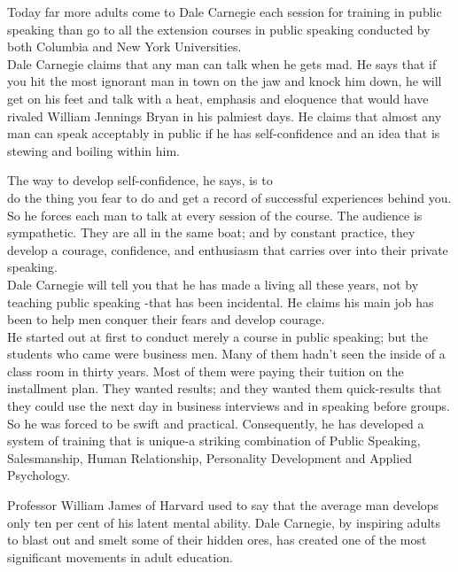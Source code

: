 \documentclass[10pt]{article}
\begin{document}
Today far more adults come to Dale Carnegie each session for training in public speaking than go to all the extension courses in public speaking conducted by both Columbia and New York Universities.\\
Dale Carnegie claims that any man can talk when he gets mad. He says that if you hit the most ignorant man in town on the jaw and knock him down, he will get on his feet and talk with a heat, emphasis and eloquence that would have rivaled William Jennings Bryan in his palmiest days. He claims that almost any man can speak acceptably in public if he has self-confidence and an idea that is stewing and boiling within him.

The way to develop self-confidence, he says, is to\\
do the thing you fear to do and get a record of successful experiences behind you. So he forces each man to talk at every session of the course. The audience is sympathetic. They are all in the same boat; and by constant practice, they develop a courage, confidence, and enthusiasm that carries over into their private speaking.\\
Dale Carnegie will tell you that he has made a living all these years, not by teaching public speaking -that has been incidental. He claims his main job has been to help men conquer their fears and develop courage.\\
He started out at first to conduct merely a course in public speaking; but the students who came were business men. Many of them hadn't seen the inside of a class room in thirty years. Most of them were paying their tuition on the installment plan. They wanted results; and they wanted them quick-results that they could use the next day in business interviews and in speaking before groups.\\
So he was forced to be swift and practical. Consequently, he has developed a system of training that is unique-a striking combination of Public Speaking, Salesmanship, Human Relationship, Personality Development and Applied Psychology.

Professor William James of Harvard used to say that the average man develops only ten per cent of his latent mental ability. Dale Carnegie, by inspiring adults to blast out and smelt some of their hidden ores, has created one of the most significant movements in adult education.
\end{document}
